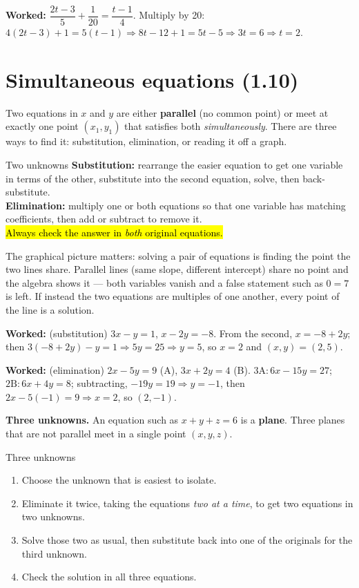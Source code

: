 \documentclass[11pt]{article}
\newcommand{\key}[1]{\hl{#1}}
\newcommand{\wex}[1]{\textbf{\color{lilacdeep}Worked:} #1}
\begin{document}
\wex{$\dfrac{2t-3}{5}+\dfrac{1}{20}=\dfrac{t-1}{4}$. Multiply by 20: $4(2t-3)+1=5(t-1)\Rightarrow8t-12+1=5t-5\Rightarrow3t=6\Rightarrow t=2$.}

\section{Simultaneous equations (1.10)}

Two equations in $x$ and $y$ are either \textbf{parallel} (no common point) or meet at exactly one point $(x_1,y_1)$ that satisfies both \emph{simultaneously}. There are three ways to find it: substitution, elimination, or reading it off a graph.

\begin{methodbox}{Two unknowns}
\textbf{Substitution:} rearrange the easier equation to get one variable in terms of the other, substitute into the second equation, solve, then back-substitute.\\[2pt]
\textbf{Elimination:} multiply one or both equations so that one variable has matching coefficients, then add or subtract to remove it.\\[2pt]
\key{Always check the answer in \emph{both} original equations.}
\end{methodbox}

The graphical picture matters: solving a pair of equations is finding the point the two lines share. Parallel lines (same slope, different intercept) share no point and the algebra shows it --- both variables vanish and a false statement such as $0=7$ is left. If instead the two equations are multiples of one another, every point of the line is a solution.

\wex{(substitution) $3x-y=1$, $x-2y=-8$. From the second, $x=-8+2y$; then $3(-8+2y)-y=1\Rightarrow5y=25\Rightarrow y=5$, so $x=2$ and $(x,y)=(2,5)$.}

\wex{(elimination) $2x-5y=9$ (A), $3x+2y=4$ (B). $3\text{A}: 6x-15y=27$; $2\text{B}: 6x+4y=8$; subtracting, $-19y=19\Rightarrow y=-1$, then $2x-5(-1)=9\Rightarrow x=2$, so $(2,-1)$.}

\textbf{Three unknowns.} An equation such as $x+y+z=6$ is a \textbf{plane}. Three planes that are not parallel meet in a single point $(x,y,z)$.

\begin{methodbox}{Three unknowns}
\begin{enumerate}[topsep=1pt,itemsep=0pt,leftmargin=*]
\item Choose the unknown that is easiest to isolate.
\item Eliminate it twice, taking the equations \emph{two at a time}, to get two equations in two unknowns.
\item Solve those two as usual, then substitute back into one of the originals for the third unknown.
\item Check the solution in all three equations.
\end{enumerate}
\end{methodbox}
\end{document}
